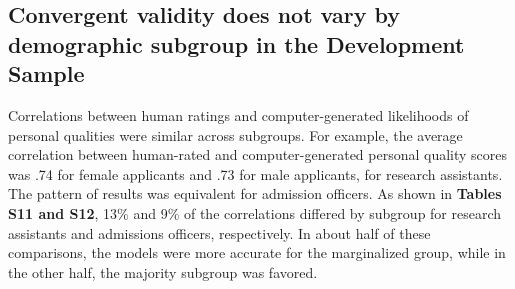 \documentclass[11pt]{report}
\begin{document}
\begin{mainf}
\subsection{Convergent validity does not vary by demographic subgroup in the Development Sample}

Correlations between human ratings and computer-generated likelihoods of personal qualities were similar across subgroups. For example, the average correlation between human-rated and computer-generated personal quality scores was .74 for female applicants and .73 for male applicants, for research assistants. The pattern of results was equivalent for admission officers. As shown in \textbf{Tables S11 and S12},  13\% and 9\% of the correlations differed by subgroup for research assistants and admissions officers, respectively. In about half of these comparisons, the models were more accurate for the marginalized group, while in the other half, the majority subgroup was favored. 


\end{mainf}
\end{document}
